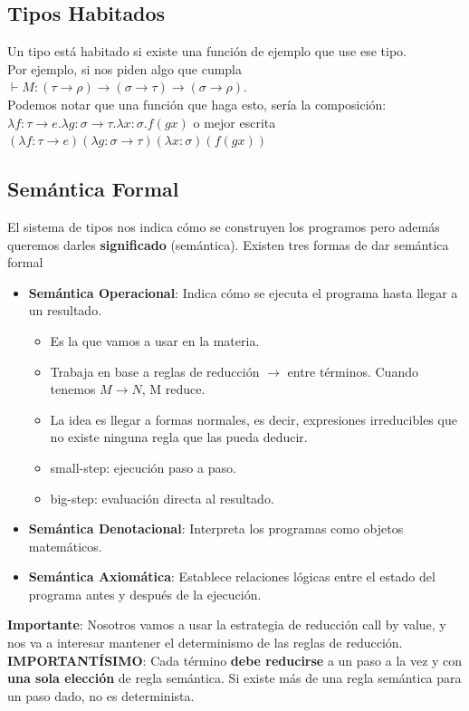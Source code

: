\documentclass[10pt,a4paper]{article}
\begin{document}
\subsection{Tipos Habitados}
Un tipo está habitado si existe una función de ejemplo que use ese tipo. \\
Por ejemplo, si nos piden algo que cumpla $\vdash M:(\tau \rightarrow \rho) \rightarrow (\sigma \rightarrow \tau) \rightarrow (\sigma \rightarrow \rho)$. \\
Podemos notar que una función que haga esto, sería la composición: $\lambda f:\tau \rightarrow e . \lambda g :\sigma \rightarrow \tau . \lambda x:\sigma . f (gx)$ o mejor escrita $(\lambda f:\tau \rightarrow e) (\lambda g :\sigma \rightarrow \tau)(\lambda x:\sigma) (f (gx))$
\subsection{Semántica Formal}
El sistema de tipos nos indica cómo se construyen los programos pero además queremos darles \textbf{significado} (semántica).
Existen tres formas de dar semántica formal 
\begin{itemize}
    \item \textbf{Semántica Operacional}: Indica cómo se ejecuta el programa hasta llegar a un resultado.
    \begin{itemize}
        \item Es la que vamos a usar en la materia.
        \item Trabaja en base a reglas de reducción $\rightarrow$ entre términos. Cuando tenemos $M\rightarrow N$, M reduce. 
        \item La idea es llegar a formas normales, es decir, expresiones irreducibles que no existe ninguna regla que las pueda deducir.
        \item small-step: ejecución paso a paso.
        \item big-step: evaluación directa al resultado.
    \end{itemize}
    \item \textbf{Semántica Denotacional}:  Interpreta los programas como objetos matemáticos.
    \item \textbf{Semántica Axiomática}: Establece relaciones lógicas entre el estado del programa antes y después de la ejecución.
\end{itemize}
\textbf{Importante}: Nosotros vamos a usar la estrategia de reducción call by value, y nos va a interesar mantener el determinismo de las reglas de reducción.
\textbf{IMPORTANTÍSIMO}: Cada término \textbf{debe reducirse} a un paso a la vez y con \textbf{una sola elección} de regla semántica. Si existe más de una regla semántica para un paso dado, no es determinista. 
\end{document}
